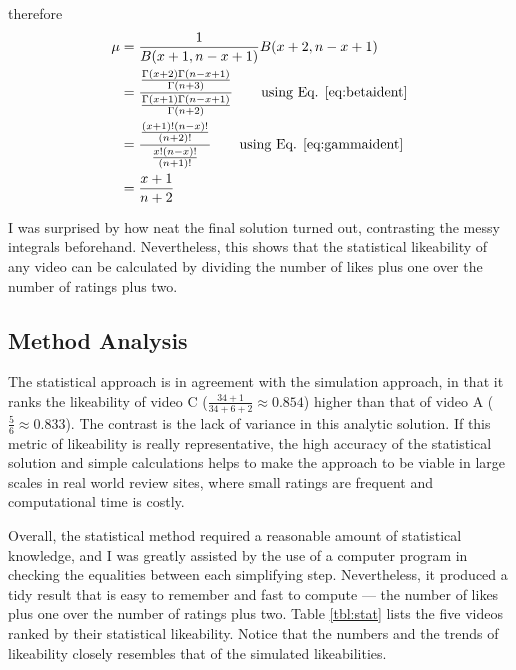 \documentclass[a4paper,11pt]{article}
\begin{document}
therefore
\begin{align*}
    \mu &= \frac{1}{B(x+1, n-x+1)}B(x+2, n-x+1)\\
    &= \frac{\frac{\Gamma(x+2)\Gamma(n-x+1)}{\Gamma(n+3)}}{\frac{\Gamma(x+1)\Gamma(n-x+1)}{\Gamma(n+2)}} \tag*{using Eq. \ref{eq:betaident}}\\
    &=  \frac{\frac{(x+1)!(n-x)!}{(n+2)!}}{\frac{x!(n-x)!}{(n+1)!}}  \tag*{using Eq. \ref{eq:gammaident}}\\
    &= \frac{x+1}{n+2}
\end{align*}

I was surprised by how neat the final solution turned out, contrasting the messy integrals beforehand. Nevertheless, this shows that the statistical likeability of any video can be calculated by dividing the number of likes plus one over the number of ratings plus two.

\subsection{Method Analysis}
The statistical approach is in agreement with the simulation approach, in that it ranks the likeability of video C ($\frac{34+1}{34+6+2} \approx 0.854$) higher than that of video A ($\frac{5}{6} \approx 0.833$). The contrast is the lack of variance in this analytic solution. If this metric of likeability is really representative, the high accuracy of the statistical solution and simple calculations helps to make the approach to be viable in large scales in real world review sites, where small ratings are frequent and computational time is costly.


Overall, the statistical method required a reasonable amount of statistical knowledge, and I was greatly assisted by the use of a computer program in checking the equalities between each simplifying step. Nevertheless, it produced a tidy result that is easy to remember and fast to compute --- the number of likes plus one over the number of ratings plus two. Table \ref{tbl:stat} lists the five videos ranked by their statistical likeability. Notice that the numbers and the trends of likeability closely resembles that of the simulated likeabilities.
\end{document}
